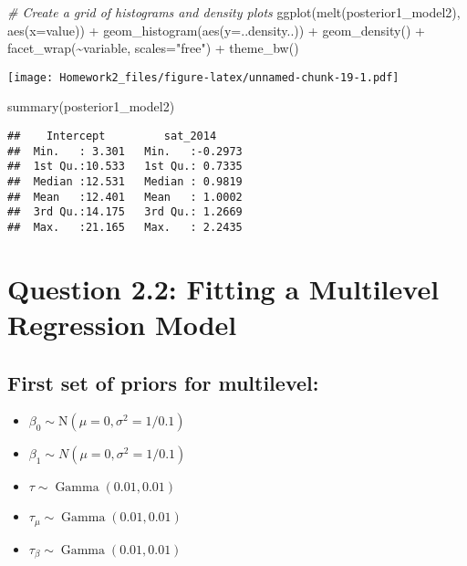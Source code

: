 \documentclass[
]{article}
\newenvironment{Shaded}{\begin{snugshade}}{\end{snugshade}}
\newcommand{\AttributeTok}[1]{\textcolor[rgb]{0.77,0.63,0.00}{#1}}
\newcommand{\CommentTok}[1]{\textcolor[rgb]{0.56,0.35,0.01}{\textit{#1}}}
\newcommand{\FunctionTok}[1]{\textcolor[rgb]{0.00,0.00,0.00}{#1}}
\newcommand{\NormalTok}[1]{#1}
\newcommand{\SpecialCharTok}[1]{\textcolor[rgb]{0.00,0.00,0.00}{#1}}
\newcommand{\StringTok}[1]{\textcolor[rgb]{0.31,0.60,0.02}{#1}}
\providecommand{\tightlist}{%
  \setlength{\itemsep}{0pt}\setlength{\parskip}{0pt}}
\begin{document}
\begin{Shaded}
\begin{Highlighting}[]
\CommentTok{\# Create a grid of histograms and density plots}
\FunctionTok{ggplot}\NormalTok{(}\FunctionTok{melt}\NormalTok{(posterior1\_model2), }\FunctionTok{aes}\NormalTok{(}\AttributeTok{x=}\NormalTok{value)) }\SpecialCharTok{+}
  \FunctionTok{geom\_histogram}\NormalTok{(}\FunctionTok{aes}\NormalTok{(}\AttributeTok{y=}\NormalTok{..density..)) }\SpecialCharTok{+}
  \FunctionTok{geom\_density}\NormalTok{() }\SpecialCharTok{+}
  \FunctionTok{facet\_wrap}\NormalTok{(}\SpecialCharTok{\textasciitilde{}}\NormalTok{variable, }\AttributeTok{scales=}\StringTok{"free"}\NormalTok{) }\SpecialCharTok{+}
  \FunctionTok{theme\_bw}\NormalTok{()}
\end{Highlighting}
\end{Shaded}

\texttt{[image: Homework2\_files/figure-latex/unnamed-chunk-19-1.pdf]}

\begin{Shaded}
\begin{Highlighting}[]
\FunctionTok{summary}\NormalTok{(posterior1\_model2)}
\end{Highlighting}
\end{Shaded}

\begin{verbatim}
##    Intercept         sat_2014      
##  Min.   : 3.301   Min.   :-0.2973  
##  1st Qu.:10.533   1st Qu.: 0.7335  
##  Median :12.531   Median : 0.9819  
##  Mean   :12.401   Mean   : 1.0002  
##  3rd Qu.:14.175   3rd Qu.: 1.2669  
##  Max.   :21.165   Max.   : 2.2435
\end{verbatim}

\hypertarget{question-2.2-fitting-a-multilevel-regression-model}{%
\section{Question 2.2: Fitting a Multilevel Regression
Model}\label{question-2.2-fitting-a-multilevel-regression-model}}

\hypertarget{first-set-of-priors-for-multilevel}{%
\subsection{First set of priors for
multilevel:}\label{first-set-of-priors-for-multilevel}}

\begin{itemize}
\tightlist
\item
  \(\beta_0 \sim \mathrm{N}\left(\mu=0, \sigma^2=1 / 0.1\right)\)
\item
  \(\beta_1 \sim N\left(\mu=0, \sigma^2=1 / 0.1\right)\)
\item
  \(\tau \sim \operatorname{Gamma}(0.01,0.01)\)
\item
  \(\tau_\mu \sim \operatorname{Gamma}(0.01,0.01)\)
\item
  \(\tau_\beta \sim \operatorname{Gamma}(0.01,0.01)\)
\end{itemize}
\end{document}
